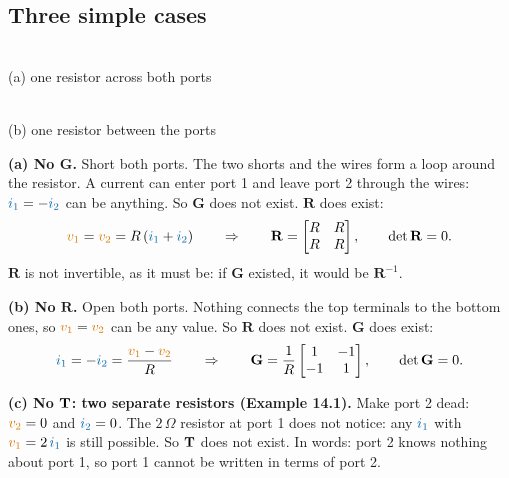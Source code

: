 \documentclass[11pt,a4paper]{article}
\newcommand{\Icol}[1]{\textcolor{ccur}{#1}}
\newcommand{\Vcol}[1]{\textcolor{cvolt}{#1}}
\newcommand{\ohm}{\,\Omega}
\newcommand{\vone}{\Vcol{v_1}}  \newcommand{\vtwo}{\Vcol{v_2}}
\newcommand{\ione}{\Icol{i_1}}  \newcommand{\itwo}{\Icol{i_2}}
\newcommand{\Rm}{\mathbf{R}}  \newcommand{\Gm}{\mathbf{G}}
\newcommand{\pone}[2]{%
  \draw (#1,#2) node[ocirc] {}; \draw (#1,0) node[ocirc] {};
  \draw[iar] (#1+0.2,#2+0.28) -- (#1+0.75,#2+0.28); \node[font=\small, text=ccur] at (#1+0.48,#2+0.58) {$i_1$};
  \node[pol] at (#1+0.3,0.72*#2) {$+$}; \node[pol] at (#1+0.3,0.22*#2) {$-$};
  \node[font=\small, text=cvolt] at (#1+0.32,0.47*#2) {$v_1$};}
\newcommand{\ptwo}[2]{%
  \draw (#1,#2) node[ocirc] {}; \draw (#1,0) node[ocirc] {};
  \draw[iar] (#1-0.2,#2+0.28) -- (#1-0.75,#2+0.28); \node[font=\small, text=ccur] at (#1-0.48,#2+0.58) {$i_2$};
  \node[pol] at (#1-0.3,0.72*#2) {$+$}; \node[pol] at (#1-0.3,0.22*#2) {$-$};
  \node[font=\small, text=cvolt] at (#1-0.32,0.47*#2) {$v_2$};}
\begin{document}
\subsection{Three simple cases}

\begin{minipage}[t]{0.47\linewidth}
\centering
{}\\[2pt]
{\small (a) one resistor across both ports}
\end{minipage}\hfill
\begin{minipage}[t]{0.47\linewidth}
\centering
{}\\[2pt]
{\small (b) one resistor between the ports}
\end{minipage}

\medskip
\textbf{(a) No $\Gm$.} Short both ports. The two shorts and the wires form a loop around the
resistor. A current can enter port 1 and leave port 2 through the wires: $\ione = -\itwo$ can be
anything. So $\Gm$ does not exist. $\Rm$ does exist:
\[
  \vone = \vtwo = R\,(\ione + \itwo)
  \qquad\Rightarrow\qquad
  \Rm = \begin{bmatrix} R & R\\ R & R \end{bmatrix}, \qquad \det \Rm = 0 .
\]
$\Rm$ is not invertible, as it must be: if $\Gm$ existed, it would be $\Rm^{-1}$.

\textbf{(b) No $\Rm$.} Open both ports. Nothing connects the top terminals to the bottom
ones, so $\vone = \vtwo$ can be any value. So $\Rm$ does not exist. $\Gm$ does exist:
\[
  \ione = -\itwo = \frac{\vone - \vtwo}{R}
  \qquad\Rightarrow\qquad
  \Gm = \frac1R\begin{bmatrix} 1 & -1\\ -1 & 1 \end{bmatrix}, \qquad \det \Gm = 0 .
\]

\textbf{(c) No $\mathbf{T}$: two separate resistors (Example 14.1).} Make port 2 dead: $\vtwo = 0$ and
$\itwo = 0$. The $2\ohm$ resistor at port 1 does not notice: any $\ione$ with $\vone = 2\,\ione$ is
still possible. So $\mathbf{T}$ does not exist. In words: port 2 knows nothing about port 1, so port 1
cannot be written in terms of port 2.
\end{document}
